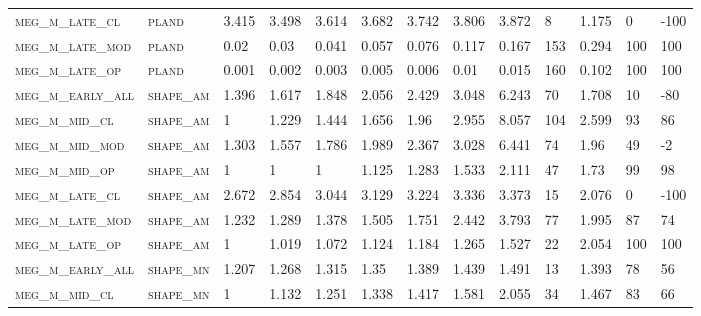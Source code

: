\begin{landscape}
\begin{center}
\begin{footnotesize}
\begin{longtable}{lllllllllllll}
\textsc{meg\_m\_late\_cl  } & \textsc{pland     }   & 3.415    & 3.498    & 3.614    & 3.682    & 3.742    & 3.806    & 3.872    & 8      & 1.175         & 0             & -100            \\
\textsc{meg\_m\_late\_mod } & \textsc{pland     }   & 0.02     & 0.03     & 0.041    & 0.057    & 0.076    & 0.117    & 0.167    & 153    & 0.294         & 100           & 100             \\
\textsc{meg\_m\_late\_op  } & \textsc{pland     }   & 0.001    & 0.002    & 0.003    & 0.005    & 0.006    & 0.01     & 0.015    & 160    & 0.102         & 100           & 100             \\
\textsc{meg\_m\_early\_all} & \textsc{shape\_am }   & 1.396    & 1.617    & 1.848    & 2.056    & 2.429    & 3.048    & 6.243    & 70     & 1.708         & 10            & -80             \\
\textsc{meg\_m\_mid\_cl   } & \textsc{shape\_am }   & 1        & 1.229    & 1.444    & 1.656    & 1.96     & 2.955    & 8.057    & 104    & 2.599         & 93            & 86              \\
\textsc{meg\_m\_mid\_mod  } & \textsc{shape\_am }   & 1.303    & 1.557    & 1.786    & 1.989    & 2.367    & 3.028    & 6.441    & 74     & 1.96          & 49            & -2              \\
\textsc{meg\_m\_mid\_op   } & \textsc{shape\_am }   & 1        & 1        & 1        & 1.125    & 1.283    & 1.533    & 2.111    & 47     & 1.73          & 99            & 98              \\
\textsc{meg\_m\_late\_cl  } & \textsc{shape\_am }   & 2.672    & 2.854    & 3.044    & 3.129    & 3.224    & 3.336    & 3.373    & 15     & 2.076         & 0             & -100            \\
\textsc{meg\_m\_late\_mod } & \textsc{shape\_am }   & 1.232    & 1.289    & 1.378    & 1.505    & 1.751    & 2.442    & 3.793    & 77     & 1.995         & 87            & 74              \\
\textsc{meg\_m\_late\_op  } & \textsc{shape\_am }   & 1        & 1.019    & 1.072    & 1.124    & 1.184    & 1.265    & 1.527    & 22     & 2.054         & 100           & 100             \\
\textsc{meg\_m\_early\_all} & \textsc{shape\_mn }   & 1.207    & 1.268    & 1.315    & 1.35     & 1.389    & 1.439    & 1.491    & 13     & 1.393         & 78            & 56              \\
\textsc{meg\_m\_mid\_cl   } & \textsc{shape\_mn }   & 1        & 1.132    & 1.251    & 1.338    & 1.417    & 1.581    & 2.055    & 34     & 1.467         & 83            & 66              \\

\end{longtable}
\end{footnotesize}
\end{center}
\end{landscape}
